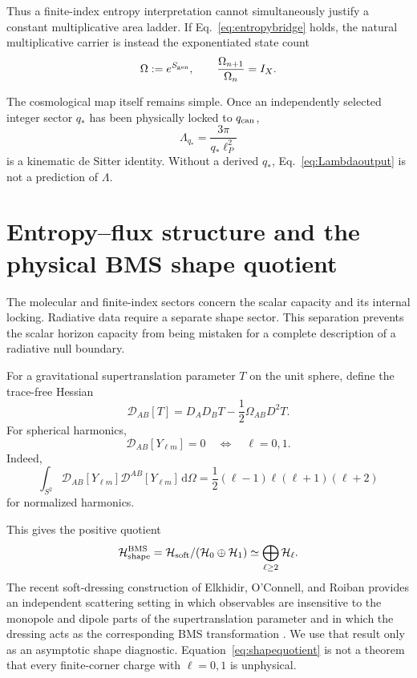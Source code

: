 \documentclass[aps,prd,preprint,nofootinbib,superscriptaddress]{revtex4-2}
\theoremstyle{definition}
\theoremstyle{remark}
\newcommand{\cH}{\mathcal H}
\newcommand{\dd}{\mathrm d}
\begin{document}
Thus a finite-index entropy interpretation cannot simultaneously justify a constant multiplicative area ladder.  If Eq.~\eqref{eq:entropybridge} holds, the natural multiplicative carrier is instead the exponentiated state count
\begin{equation}
\Omega:=e^{S_{\rm gen}},
\qquad
\frac{\Omega_{n+1}}{\Omega_n}=I_X.
\label{eq:Omega}
\end{equation}

The cosmological map itself remains simple.  Once an independently selected integer sector $q_*$ has been physically locked to $q_{\rm can}$,
\begin{equation}
\Lambda_{q_*}
=
\frac{3\pi}{q_*\ell_P^2}
\label{eq:Lambdaoutput}
\end{equation}
is a kinematic de Sitter identity.  Without a derived $q_*$, Eq.~\eqref{eq:Lambdaoutput} is not a prediction of $\Lambda$.




\section{Entropy--flux structure and the physical BMS shape quotient}
\label{sec:bms}

The molecular and finite-index sectors concern the scalar capacity and its
internal locking.  Radiative data require a separate shape sector.  This
separation prevents the scalar horizon capacity from being mistaken for a
complete description of a radiative null boundary.

For a gravitational supertranslation parameter $T$ on the unit sphere,
define the trace-free Hessian
\begin{equation}
\mathcal D_{AB}[T]
=
D_AD_BT-\frac12\Omega_{AB}D^2T.
\label{eq:shapehessian}
\end{equation}
For spherical harmonics,
\begin{equation}
\mathcal D_{AB}[Y_{\ell m}]=0
\quad\Longleftrightarrow\quad
\ell=0,1.
\label{eq:shapekernel}
\end{equation}
Indeed,
\begin{equation}
\int_{S^2}
\mathcal D_{AB}[Y_{\ell m}]
\mathcal D^{AB}[Y_{\ell m}]
\,\dd\Omega
=
\frac12(\ell-1)\ell(\ell+1)(\ell+2)
\label{eq:shapenorm}
\end{equation}
for normalized harmonics.

This gives the positive quotient
\begin{equation}
\cH_{\rm shape}^{\rm BMS}
=
\cH_{\rm soft}/(\cH_0\oplus\cH_1)
\simeq
\bigoplus_{\ell\ge2}\cH_\ell.
\label{eq:shapequotient}
\end{equation}
The recent soft-dressing construction of
Elkhidir, O'Connell, and Roiban provides an independent scattering setting in
which observables are insensitive to the monopole and dipole parts of the
supertranslation parameter and in which the dressing acts as the
corresponding BMS transformation \cite{ElkhidirOConnellRoiban2026}.  We use
that result only as an asymptotic shape diagnostic.  Equation~\eqref{eq:shapequotient}
is not a theorem that every finite-corner charge with $\ell=0,1$ is
unphysical.
\end{document}

